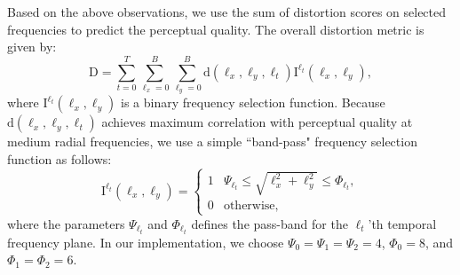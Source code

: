 \documentclass{sig-alternate}
\begin{document}
Based on the above observations, we use the sum of distortion scores on selected frequencies to predict the perceptual quality. The overall distortion metric is given by:
\begin{equation}
\label{eq:final_score}
\mathrm{D} = \sum_{t=0}^T\sum_{\ell_x=0}^{B}\sum_{\ell_y=0}^{B}\mathrm{d}(\ell_x,\ell_y,\ell_t)\mathrm{I}^{\ell_t}(\ell_x,\ell_y),
\end{equation} 
where $\mathrm{I}^{\ell_t}(\ell_x,\ell_y)$ is a binary frequency selection function. Because $\mathrm{d}(\ell_x,\ell_y,\ell_t)$ achieves maximum correlation with perceptual quality at medium radial frequencies, we use a simple ``band-pass" frequency selection function as follows:
\begin{equation}
\label{eq:freqency_selection}
\mathrm{I}^{\ell_t}(\ell_x,\ell_y) =
\begin{cases}
1 & \Psi_{\ell_t}\leq\sqrt{\ell_x^2 +\ell_y^2}\leq \Phi_{\ell_t},\\
0 & \text{otherwise},
\end{cases}
\end{equation}
where the parameters $\Psi_{\ell_t}$ and $\Phi_{\ell_t}$ defines the pass-band for the $\ell_t$'th temporal frequency plane. In our implementation, we choose $\Psi_0=\Psi_1=\Psi_2=4$, $\Phi_0=8$, and $\Phi_1=\Phi_2=6$.
\end{document}
